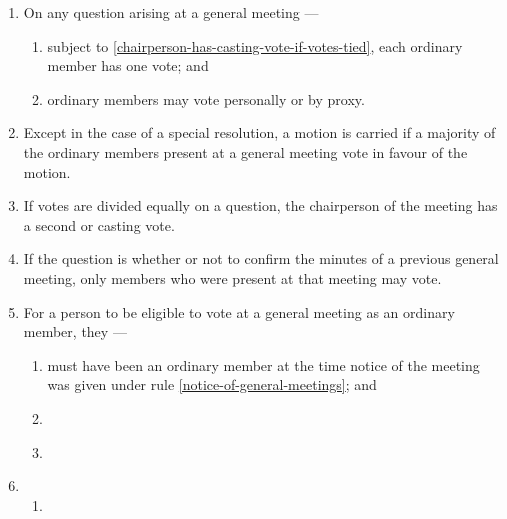 \documentclass[../constitution.tex]{subfiles}
\begin{document}
\begin{enumerate}

\item On any question arising at a general meeting ---


  \begin{enumerate}
  
  \item subject to  \ref{chairperson-has-casting-vote-if-votes-tied}, each ordinary member has one vote; and
  \item ordinary members may vote personally or by proxy.
  \end{enumerate}
\item Except in the case of a special resolution, a motion is carried if a majority of the ordinary members present at a general meeting vote in favour of the motion.
\item If votes are divided equally on a question, the chairperson of the meeting has a second or casting vote. \label{chairperson-has-casting-vote-if-votes-tied}
\item If the question is whether or not to confirm the minutes of a previous general meeting, only members who were present at that meeting may vote.
\item For a person to be eligible to vote at a general meeting as an ordinary member, they ---

  \begin{enumerate}
  \item must have been an ordinary member at the time notice of the meeting was given under rule \ref{notice-of-general-meetings}; and
  \item {}
  \item {} \label{debts-cant-vote}
  \end{enumerate}

\item {}
  \begin{enumerate}
  \item {}
  \end{enumerate}


\end{enumerate}
\end{document}
